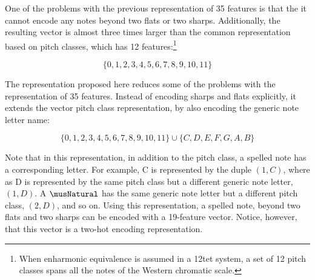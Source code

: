 
One of the problems with the previous representation of 35
features is that the it cannot encode any notes beyond two
flats or two sharps. Additionally, the resulting vector is
almost three times larger than the common representation
based on pitch classes, which has 12 features:\footnote{When
enharmonic equivalence is assumed in a \gls{12tet} system, a
set of 12 pitch classes spans all the notes of the Western
chromatic scale.}

\begin{equation}
    \{0, 1, 2, 3, 4, 5, 6, 7, 8, 9, 10, 11\}
\end{equation}

The representation proposed here reduces some of the
problems with the representation of 35 features. Instead of
encoding sharps and flats explicitly, it extends the vector
pitch class representation, by also encoding the generic
note letter name:

\begin{equation}
    \{0, 1, 2, 3, 4, 5, 6, 7, 8, 9, 10, 11\} \cup \{C, D, E, F, G, A, B\}
\end{equation}

Note that in this representation, in addition to the pitch
class, a spelled note has a corresponding letter. For
example, C\musSharp{} is represented by the duple $(1, C)$,
where as D\musFlat{} is represented by the same pitch class
but a different generic note letter, $(1, D)$. A
$\musNatural$ has the same generic note letter but a
different pitch class, $(2, D)$, and so on. Using this
representation, a spelled note, beyond two flats and two
sharps can be encoded with a 19-feature vector. Notice,
however, that this vector is a two-hot encoding
representation.
